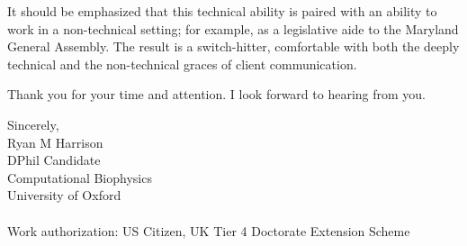 \documentclass{../res}
\begin{document}
\begin{sloppypar}
\begin{resume}
It should be emphasized that this technical ability is paired with an ability to work in a non-technical setting; for example, as a legislative aide to the Maryland General Assembly. The result is a switch-hitter, comfortable with both the deeply technical and the non-technical graces of client communication.

Thank you for your time and attention. I look forward to hearing from you.

Sincerely, \\
Ryan M Harrison \\ 
DPhil Candidate \\
Computational Biophysics \\
University of Oxford  \\ \\
Work authorization: US Citizen, UK Tier 4 Doctorate Extension Scheme
\end{resume} 
\end{sloppypar}
\end{document}
